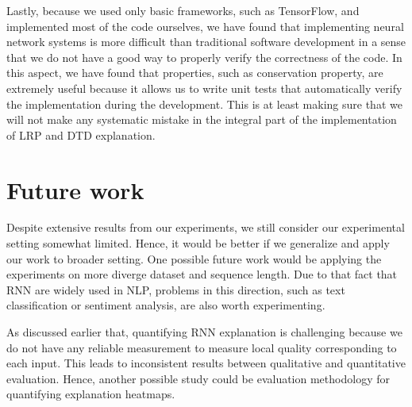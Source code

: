 Lastly, because we used only basic frameworks, such as TensorFlow, and implemented most of the code ourselves, we have found that implementing neural network systems is more difficult than traditional software development in a sense that we do not have a good way to properly verify the correctness of the code. In this aspect, we have found that properties, such as conservation property, are extremely useful because it allows us to write unit tests that automatically verify the implementation during the development. This is at least making sure that we will not make any systematic mistake in the integral part of the implementation of LRP and DTD explanation.


\section{Future work}
Despite extensive results from our experiments, we still consider our experimental setting somewhat limited. Hence, it would be better if we generalize and apply our work to broader setting. One possible future work would be applying the experiments on more diverge dataset and sequence length. Due to that fact that RNN are widely used in NLP, problems in this direction, such as text classification or sentiment analysis, are also worth experimenting. 

As discussed earlier that,  quantifying RNN explanation is challenging because we do not have any reliable measurement to measure local quality corresponding to each input. This leads to inconsistent results between qualitative and quantitative evaluation. Hence, another possible study could be evaluation methodology for quantifying explanation heatmaps.
%
%
%
%
